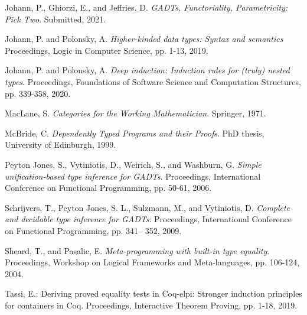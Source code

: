 \documentclass[9pt]{entcs}
\begin{document}
\begin{thebibliography}{10}
 Johann, P., Ghiorzi, E., and Jeffries, D. {\em
  GADTs, Functoriality, Parametricity: Pick Two}. Submitted, 2021.

 Johann, P. and Polonsky, A. {\em Higher-kinded data
  types: Syntax and semantics} Proceedings, Logic in Computer Science,
  pp. 1-13, 2019.

 Johann, P. and Polonsky, A. {\em Deep induction:
  Induction rules for (truly) nested types}.  Proceedings, Foundations
  of Software Science and Computation Structures, pp. 339-358, 2020.

 MacLane, S. {\em Categories for the Working
  Mathematician}. Springer, 1971.

 McBride, C. {\em Dependently Typed Programs and their
  Proofs}. PhD thesis, University of Edinburgh, 1999.




 Peyton Jones, S., Vytiniotis, D., Weirich, S., and
  Washburn, G. {\em Simple unification-based type inference for
    GADTs}. Proceedings, International Conference on Functional
  Programming, pp. 50-61, 2006. 


 Schrijvers, T., Peyton Jones, S. L., Sulzmann, M., and
  Vytiniotis, D. {\em Complete and decidable type inference for
    GADTs}. Proceedings, International Conference on Functional
  Programming, pp. 341– 352, 2009.

 Sheard, T., and Pasalic, E. {\em Meta-programming with
  built-in type equality}. Proceedings, Workshop on Logical Frameworks
  and Meta-languages, pp. 106-124, 2004. 

 Tassi, E.: Deriving proved equality tests in Coq-elpi:
  Stronger induction principles for containers in Coq. Proceedings,
  Interactive Theorem Proving, pp. 1-18, 2019.
  

\end{thebibliography}
\end{document}

